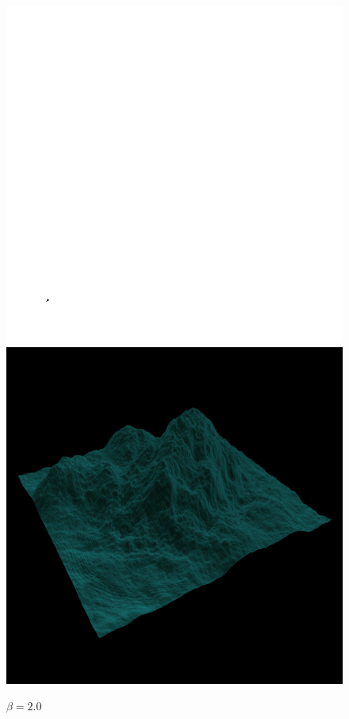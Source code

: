 		\begin{figure}[H]
		  \centering
		  \includegraphics[width=\imagewidth]{images/results/terrains/512-1/fourier/20}
		  \includegraphics[width=\imagewidth]{images/results/terrains/512-1/fourier/20_3d}
		  \caption{$\beta = 2.0$}
		  \label{fig:ex-fourier20-surface}
		\end{figure}
		
